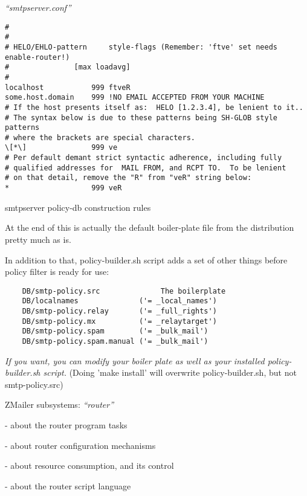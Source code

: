 \documentclass[a4paper,landscape]{slides}
\newcommand{\ZM}{ZMailer}
\begin{document}
\begin{overlay}
\small
\centerline{{\it ``smtpserver.conf''}}
\tiny
\begin{verbatim}
#
#
# HELO/EHLO-pattern     style-flags (Remember: 'ftve' set needs enable-router!)
#               [max loadavg]
#
localhost           999 ftveR
some.host.domain    999 !NO EMAIL ACCEPTED FROM YOUR MACHINE
# If the host presents itself as:  HELO [1.2.3.4], be lenient to it..
# The syntax below is due to these patterns being SH-GLOB style patterns
# where the brackets are special characters.
\[*\]               999 ve
# Per default demant strict syntactic adherence, including fully
# qualified addresses for  MAIL FROM, and RCPT TO.  To be lenient
# on that detail, remove the "R" from "veR" string below:
*                   999 veR

\end{verbatim}

\end{overlay}

\begin{overlay}
\centerline{smtpserver policy-db construction rules}

\small
At the end of this is actually the default boiler-plate file from
the distribution pretty much as is.

In addition to that, policy-builder.sh script adds a set of other
things before policy filter is ready for use:
\begin{verbatim}
    DB/smtp-policy.src              The boilerplate
    DB/localnames              ('= _local_names')
    DB/smtp-policy.relay       ('= _full_rights')
    DB/smtp-policy.mx          ('= _relaytarget')
    DB/smtp-policy.spam        ('= _bulk_mail')
    DB/smtp-policy.spam.manual ('= _bulk_mail')
\end{verbatim}

{\it If you want, you can modify your boiler plate as well as your
installed policy-builder.sh script.}  (Doing 'make install' will
overwrite policy-builder.sh, but not  smtp-policy.src)


\end{overlay}



\begin{slide}

\centerline{\large \ZM{} subsystems: {\it ``router''}}

- about the router program tasks

- about router configuration mechanisms

- about resource consumption, and its control

- about the router script language


\vfill

\end{slide}
\end{document}
